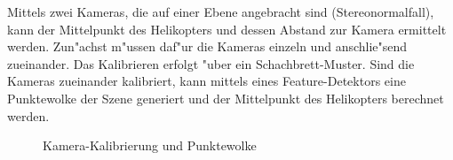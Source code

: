 \noindent Mittels zwei Kameras, die auf einer Ebene angebracht sind (Stereonormalfall), kann der Mittelpunkt des Helikopters und dessen Abstand zur Kamera ermittelt werden.\newline
Zun"achst m"ussen daf"ur die Kameras einzeln und anschlie"send zueinander. Das Kalibrieren erfolgt "uber ein Schachbrett-Muster. Sind die Kameras zueinander kalibriert, kann mittels eines Feature-Detektors eine Punktewolke der Szene generiert und der Mittelpunkt des Helikopters berechnet werden.

\begin{figure}%
	\centering
	\qquad
	\caption{Kamera-Kalibrierung und Punktewolke}%
	\label{fig:extendetabstract}%
\end{figure}

